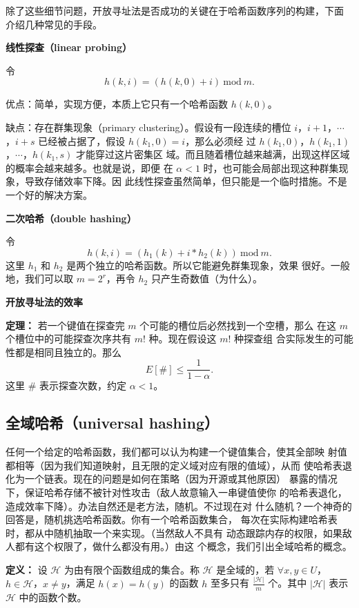 \documentclass[a4paper]{ctexart}
\theoremstyle{definition}
\theoremstyle{definition}
\begin{document}
除了这些细节问题，开放寻址法是否成功的关键在于哈希函数序列的构建，下面
介绍几种常见的手段。

{\bf 线性探查（linear probing）}

令
$$
h(k, i) = (h(k, 0) + i) ~ \mathrm{mod} ~ m.
$$

优点：简单，实现方便，本质上它只有一个哈希函数 $h(k, 0)$。

缺点：存在群集现象（primary clustering）。假设有一段连续的槽位 $i$，$i
+ 1$，$\cdots$，$i + s$ 已经被占据了，假设 $h(k_1, 0) = i$，那么必须经
过 $h(k_1, 0)$，$h(k_1, 1)$，$\cdots$，$h(k_1, s)$ 才能穿过这片密集区
域。而且随着槽位越来越满，出现这样区域的概率会越来越多。也就是说，即便
在 $\alpha < 1$ 时，也可能会局部出现这种群集现象，导致存储效率下降。因
此线性探查虽然简单，但只能是一个临时措施。不是一个好的解决方案。

{\bf 二次哈希（double hashing）}

令
$$
h(k, i) = (h_1(k) + i * h_2(k))~\mathrm{mod}~m.
$$
这里 $h_1$ 和 $h_2$ 是两个独立的哈希函数。所以它能避免群集现象，效果
很好。一般地，我们可以取 $m = 2^r$，再令 $h_2$ 只产生奇数值（为什么）。

{\bf 开放寻址法的效率}

{\bf 定理：} 若一个键值在探查完 $m$ 个可能的槽位后必然找到一个空槽，那么
在这 $m$ 个槽位中的可能探查次序共有 $m!$ 种。现在假设这 $m!$ 种探查组
合实际发生的可能性都是相同且独立的。那么
$$
E[\#] \leq \frac{1}{1 - \alpha}.
$$
这里 $\#$ 表示探查次数，约定 $\alpha < 1$。


\subsection{全域哈希（universal hashing）}

任何一个给定的哈希函数，我们都可以认为构建一个键值集合，使其全部映
射值都相等（因为我们知道映射，且无限的定义域对应有限的值域），从而
使哈希表退化为一个链表。现在的问题是如何在策略（因为开源或其他原因）
暴露的情况下，保证哈希存储不被针对性攻击（敌人故意输入一串键值使你
的哈希表退化，造成效率下降）。办法自然还是老方法，随机。不过现在对
什么随机？一个神奇的回答是，随机挑选哈希函数。你有一个哈希函数集合，
每次在实际构建哈希表时，都从中随机抽取一个来实现。（当然敌人不具有
动态跟踪内存的权限，如果敌人都有这个权限了，做什么都没有用。）由这
个概念，我们引出全域哈希的概念。

{\bf 定义：} 设 $\mathscr{H}$ 为由有限个函数组成的集合。称
$\mathscr{H}$ 是全域的，若 $\forall x, y \in U$，$h \in
\mathscr{H}$，$x \neq y$，满足 $h(x) = h(y)$ 的函数 $h$
至多只有 $\frac{|\mathscr{H}|}{m}$ 个。其中
$|\mathscr{H}|$ 表示 $\mathscr{H}$ 中的函数个数。
\end{document}
